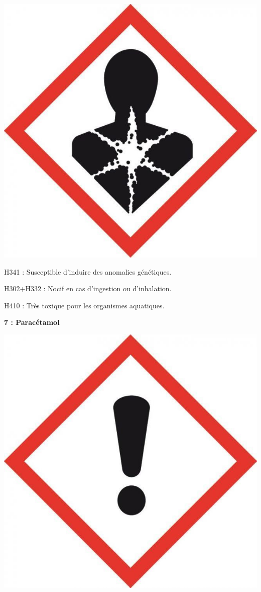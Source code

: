 \documentclass[12pt,a4paper]{article}
\begin{document}
\begin{multicols}{2}
\begin{doc}
\begin{center}
\includegraphics[scale=0.05]{images/pict_cancer.jpg}
\end{center}

\footnotesize
\noindent
H341 : Susceptible d'induire des anomalies génétiques.

\noindent
H302+H332 : Nocif en cas d’ingestion ou d’inhalation.

\noindent
H410 : Très toxique pour les organismes aquatiques.
\end{doc}

\begin{doc}
\textbf{7 : Paracétamol}

\begin{center}
\includegraphics[scale=0.05]{images/pict_nocif.jpg}
\end{center}


\end{doc}
\end{multicols}
\end{document}
